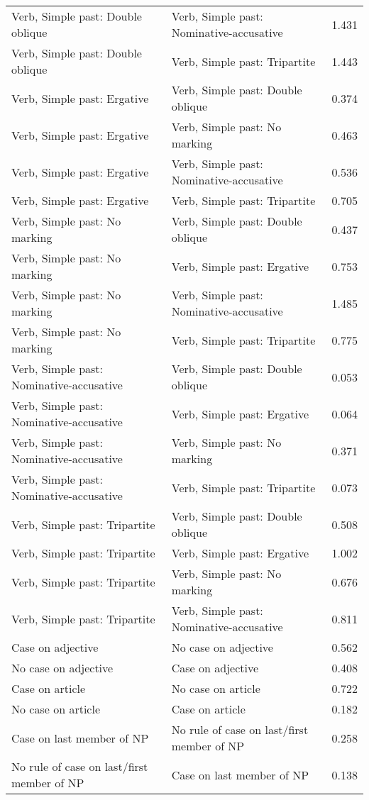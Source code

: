 \begin{longtable}{p{.4\linewidth}p{.4\linewidth}p{.1\linewidth}}
Verb, Simple past: Double oblique & Verb, Simple past: Nominative-accusative & 1.431\\
Verb, Simple past: Double oblique & Verb, Simple past: Tripartite & 1.443\\
Verb, Simple past: Ergative & Verb, Simple past: Double oblique & 0.374\\
Verb, Simple past: Ergative & Verb, Simple past: No marking & 0.463\\
Verb, Simple past: Ergative & Verb, Simple past: Nominative-accusative & 0.536\\
Verb, Simple past: Ergative & Verb, Simple past: Tripartite & 0.705\\
Verb, Simple past: No marking & Verb, Simple past: Double oblique & 0.437\\
Verb, Simple past: No marking & Verb, Simple past: Ergative & 0.753\\
Verb, Simple past: No marking & Verb, Simple past: Nominative-accusative & 1.485\\
Verb, Simple past: No marking & Verb, Simple past: Tripartite & 0.775\\
Verb, Simple past: Nominative-accusative & Verb, Simple past: Double oblique & 0.053\\
Verb, Simple past: Nominative-accusative & Verb, Simple past: Ergative & 0.064\\
Verb, Simple past: Nominative-accusative & Verb, Simple past: No marking & 0.371\\
Verb, Simple past: Nominative-accusative & Verb, Simple past: Tripartite & 0.073\\
Verb, Simple past: Tripartite & Verb, Simple past: Double oblique & 0.508\\
Verb, Simple past: Tripartite & Verb, Simple past: Ergative & 1.002\\
Verb, Simple past: Tripartite & Verb, Simple past: No marking & 0.676\\
Verb, Simple past: Tripartite & Verb, Simple past: Nominative-accusative & 0.811\\
Case on adjective & No case on adjective & 0.562\\
No case on adjective & Case on adjective & 0.408\\
Case on article & No case on article & 0.722\\
No case on article & Case on article & 0.182\\
Case on last member of NP & No rule of case on last/first member of NP & 0.258\\
No rule of case on last/first member of NP & Case on last member of NP & 0.138\\

\end{longtable}
